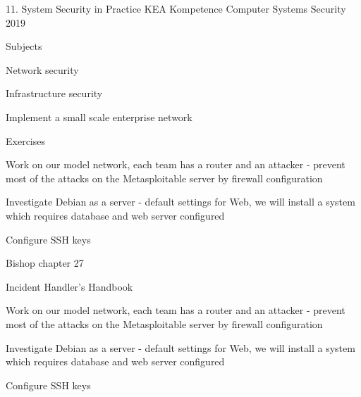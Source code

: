 \documentclass[Screen16to9,17pt]{foils}
\begin{document}
\mytitlepage
{11. System Security in Practice}
{KEA Kompetence Computer Systems Security 2019}



\begin{list1}
\item Subjects
\begin{list2}
\item Network security
\item Infrastructure security
\item Implement a small scale enterprise network
\end{list2}
\item Exercises
\begin{list2}
\item Work on our model network, each team has a router and an attacker - prevent most of the attacks on the Metasploitable server by firewall configuration
\item Investigate Debian as a server - default settings for Web, we will install a system which requires database and web server configured
\item Configure SSH keys
\end{list2}
\end{list1}




\begin{list1}
\item Bishop chapter 27
\item Incident Handler's Handbook
\end{list1}









\begin{list1}
\item Work on our model network, each team has a router and an attacker - prevent most of the attacks on the Metasploitable server by firewall configuration
\item Investigate Debian as a server - default settings for Web, we will install a system which requires database and web server configured
\item Configure SSH keys
\end{list1}



\slidenext
\end{document}
